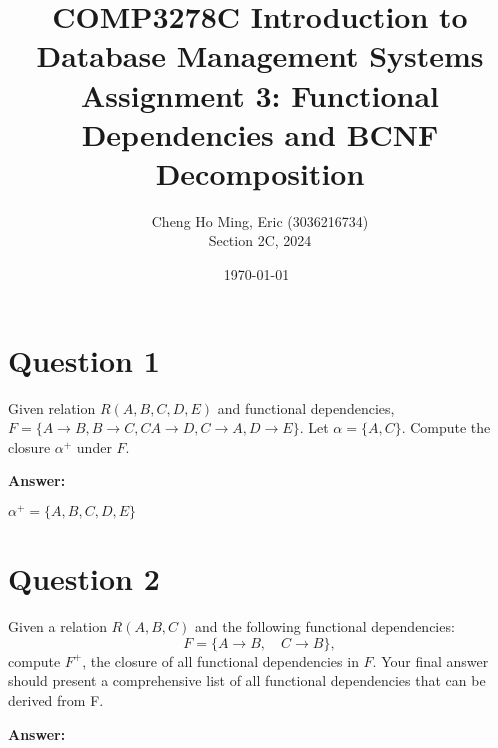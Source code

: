 \documentclass{article}[a4paper,11pt]
\title{COMP3278C Introduction to Database Management Systems \\ Assignment 3: Functional Dependencies and BCNF Decomposition}
\author{Cheng Ho Ming, Eric (3036216734) \\ Section 2C, 2024}
\date{\today \ \currenttime}
\begin{document}
\maketitle

\section*{Question 1}

Given relation $R(A, B, C, D, E)$ and functional dependencies, $F = \{ A \rightarrow B, B \rightarrow C, CA \rightarrow D, C \rightarrow A, D \rightarrow E \}$. Let $\alpha = \{A, C\}$. Compute the closure $\alpha^+$ under $F$.

\vspace{1em} 

\noindent 
\textbf{Answer:}

$\alpha^+ = \{ A, B, C, D, E \}$

\section*{Question 2}

Given a relation $R(A, B, C)$ and the following functional dependencies:
\[ F = \{ A \rightarrow B, \quad C \rightarrow B \}, \]
compute $F^+$, the closure of all functional dependencies in $F$. Your final answer should present a comprehensive list of all functional dependencies that can be derived from F.

\vspace{1em}

\noindent 
\textbf{Answer:}
\end{document}
